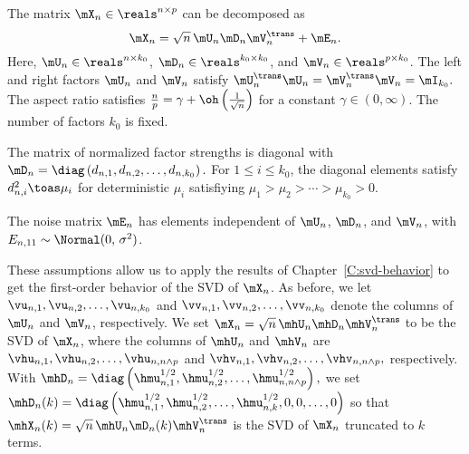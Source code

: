 \begin{assumption}
    The matrix $\mX_n \in \reals^{n \times p}$ can be decomposed as
    \[
        \mX_n = \sqrt{n} \, \mU_n \mD_n \mV_n^\trans + \mE_n.
    \]
    Here, 
    $\mU_n \in \reals^{n \times k_0}$, $\mD_n \in \reals^{k_0 \times k_0}$,
    and $\mV_n \in \reals^{p \times k_0}$.  The left and right factors
    $\mU_n$ and $\mV_n$ satisfy
    \(
        \mU_n^\trans \mU_n = \mV_n^\trans \mV_n = \mI_{k_0}.
    \)
    The aspect ratio satisfies
    $\frac{n}{p} = \gamma + \oh\left( \frac{1}{\sqrt{n}}\right)$ for a
    constant $\gamma \in (0, \infty)$.  The number of factors $k_0$
    is fixed.
\end{assumption}

\begin{assumption}
    The matrix of normalized factor strengths is diagonal with
    \(
        \mD_n
            =
                \diag \left(
                    d_{n,1}, d_{n,2}, \ldots, d_{n,k_0}
                \right).
    \)
    For $1 \leq i \leq k_0$, the diagonal elements satisfy
    $d_{n,i}^2 \toas \mu_i$ for deterministic $\mu_i$ satisfiying
    \(
        \mu_1 > \mu_2 > \cdots > \mu_{k_0} > 0.
    \)
\end{assumption}

\begin{assumption}
    The noise matrix $\mE_n$ has \iid elements independent of $\mU_n$, 
    $\mD_n$, and $\mV_n$, with $E_{n,11} \sim \Normal( 0, \, \sigma^2)$.
\end{assumption}

\noindent
These assumptions allow us to apply the results of 
Chapter~\ref{C:svd-behavior} to get the first-order behavior of the
SVD of $\mX_n$.  As before, we let $\vu_{n,1}, \vu_{n,2}, \ldots, \vu_{n,k_0}$
and $\vv_{n,1}, \vv_{n,2}, \ldots, \vv_{n,k_0}$ denote the columns of
$\mU_n$ and $\mV_n$, respectively.  We set 
$\mX_n = \sqrt{n} \, \mhU_n \mhD_n \mhV_n^\trans$ to be the SVD of $\mX_n$,
where the columns of $\mhU_n$ and $\mhV_n$ are
\(
    \vhu_{n,1}, \vhu_{n,2}, \ldots, \vhu_{n,n\wedge p}
\)
and
\(
    \vhv_{n,1}, \vhv_{n,2}, \ldots, \vhv_{n,n\wedge p},
\)
respectively.  With
\(
    \mhD_n 
        = 
            \diag \left(
                \hmu_{n,1}^{1/2}, 
                \hmu_{n,2}^{1/2}, 
                \ldots, 
                \hmu_{n,n\wedge p}^{1/2}
            \right),
\)
we set
\(
    \mhD_n(k)
        =
            \diag \left(
                \hmu_{n,1}^{1/2}, 
                \hmu_{n,2}^{1/2}, 
                \ldots, 
                \hmu_{n,k}^{1/2}, 
                0, 
                0,
                \ldots, 
                0
            \right)
\)
so that
\(
    \mhX_{n}(k) = \sqrt{n} \, \mhU_n \mD_n(k) \mhV_n^\trans
\)
is the SVD of $\mX_n$ truncated to $k$ terms.

